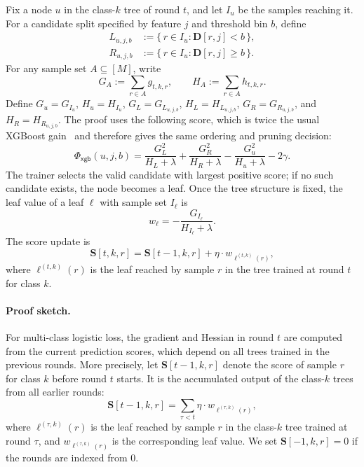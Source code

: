 Fix a node $u$ in the class-$k$ tree of round $t$, and let $I_u$ be the samples
reaching it.  For a candidate split specified by feature $j$ and threshold bin
$b$, define
\begin{align}
L_{u,j,b} &:= \{\, r\in I_u : \mathbf{D}[r,j] < b \,\},\\
R_{u,j,b} &:= \{\, r\in I_u : \mathbf{D}[r,j] \ge b \,\}.
\end{align}
For any sample set $A\subseteq[M]$, write
\[
    G_A := \sum_{r\in A} g_{t,k,r},
    \qquad
    H_A := \sum_{r\in A} h_{t,k,r}.
\]
Define $G_u=G_{I_u}$, $H_u=H_{I_u}$,
$G_L=G_{L_{u,j,b}}$, $H_L=H_{L_{u,j,b}}$,
$G_R=G_{R_{u,j,b}}$, and $H_R=H_{R_{u,j,b}}$.
The proof uses the following score, which is twice the usual XGBoost gain~\cite{xgboost16} and
therefore gives the same ordering and pruning decision:
\begin{equation}\label{eq:xgb-gain}
    \Phi_{\mathsf{xgb}}(u,j,b)
    =
    \frac{G_L^2}{H_L+\lambda}
    +
    \frac{G_R^2}{H_R+\lambda}
    -
    \frac{G_u^2}{H_u+\lambda}
    -
    2\gamma .
\end{equation}
The trainer selects the valid candidate with largest positive score; if no such candidate exists, the node becomes a
leaf.  Once the tree structure is fixed, the leaf value of a leaf $\ell$ with
sample set $I_\ell$ is
\begin{equation}\label{eq:xgb-leaf}
    w_{\ell}
    =
    -
    \frac{G_{I_\ell}}{H_{I_\ell}+\lambda}.
\end{equation}
The score update is
\[
    \mathbf{S}[t,k,r]
    =
    \mathbf{S}[t-1,k,r]
    +
    \eta \cdot w_{\ell^{(t,k)}(r)} ,
\]
where $\ell^{(t,k)}(r)$ is the leaf reached by sample $r$ in the tree trained
at round $t$ for class $k$.

\paragraph{Proof sketch.}

For multi-class logistic loss, the gradient and Hessian in round $t$ are
computed from the current prediction scores, which depend on all trees trained
in the previous rounds. More precisely, let $\mathbf{S}[t-1,k,r]$ denote the
score of sample $r$ for class $k$ before round $t$ starts. It is the accumulated
output of the class-$k$ trees from all earlier rounds:
\[
    \mathbf{S}[t-1,k,r]
    =
    \sum_{\tau < t}
    \eta \cdot
    w_{\ell^{(\tau,k)}(r)},
\]
where $\ell^{(\tau,k)}(r)$ is the leaf reached by sample $r$ in the class-$k$
tree trained at round $\tau$, and $w_{\ell^{(\tau,k)}(r)}$ is the corresponding
leaf value. We set $\mathbf{S}[-1,k,r]=0$ if the rounds are indexed from $0$.

